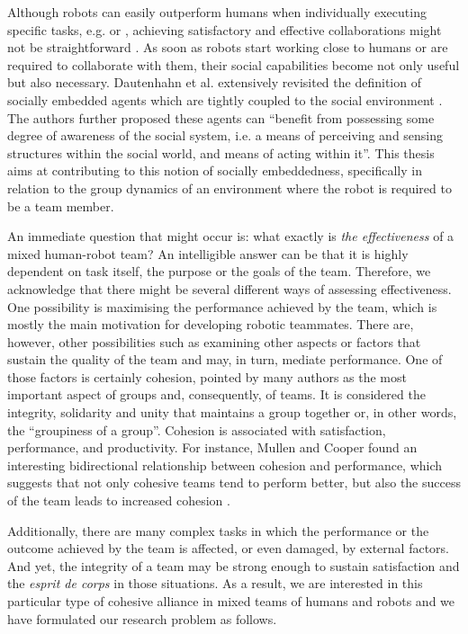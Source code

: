 Although robots can easily outperform humans when individually executing specific tasks, e.g. \cite{butner2003transforming} or \cite{cicconet2012visual}, achieving satisfactory and effective collaborations might not be straightforward \cite{bauer2008human}. As soon as robots start working close to humans or are required to collaborate with them, their social capabilities become not only useful but also necessary. Dautenhahn et al. extensively revisited the definition of socially embedded agents which are tightly coupled to the social environment \cite{dautenhahn2002embodied}. The authors further proposed these agents can ``benefit from possessing some degree of awareness of the social system, i.e. a means of perceiving and sensing structures within the social world, and means of acting within it''. This thesis aims at contributing to this notion of socially embeddedness, specifically in relation to the group dynamics of an environment where the robot is required to be a team member.



An immediate question that might occur is: what exactly is \textit{the effectiveness} of a mixed human-robot team? An intelligible answer can be that it is highly dependent on task itself, the purpose or the goals of the team. Therefore, we acknowledge that there might be several different ways of assessing effectiveness. One possibility is maximising the performance achieved by the team, which is mostly the main motivation for developing robotic teammates. There are, however, other possibilities such as examining other aspects or factors that sustain the quality of the team and may, in turn, mediate performance. One of those factors is certainly cohesion, pointed by many authors as the most important aspect of groups and, consequently, of teams. It is considered the integrity, solidarity and unity that maintains a group together or, in other words, the ``groupiness of a group''. Cohesion is associated with satisfaction, performance, and productivity. For instance, Mullen and Cooper found an interesting bidirectional relationship between cohesion and performance, which suggests that not only cohesive teams tend to perform better, but also the success of the team leads to increased cohesion \cite{mullen1994relation}.


Additionally, there are many complex tasks in which the performance or the outcome achieved by the team is affected, or even damaged, by external factors. And yet, the integrity of a team may be strong enough to sustain satisfaction and the \textit{esprit de corps} in those situations. As a result, we are interested in this particular type of cohesive alliance in mixed teams of humans and robots and we have formulated our research problem as follows.

